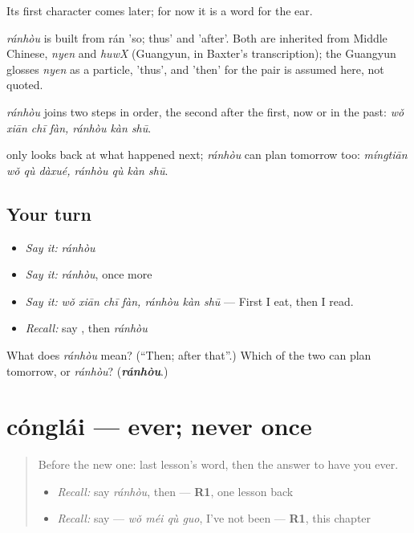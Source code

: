 Its first character comes later; for now it is a word for the ear.

\begin{cousinweb}
\emph{ránhòu} is built from rán 'so; thus' and  'after'. Both are inherited from Middle Chinese, \emph{nyen} and \emph{huwX} (Guangyun, in Baxter's transcription); the Guangyun glosses \emph{nyen} as a particle, 'thus', and 'then' for the pair is assumed here, not quoted.
\end{cousinweb}

\begin{grammarlens}[title={What you've built}]
\emph{ránhòu} joins two steps in order, the second after the first, now or in the past: \emph{wǒ xiān chī fàn, ránhòu kàn shū}.

 only looks back at what happened next; \emph{ránhòu} can plan tomorrow too: \emph{míngtiān wǒ qù dàxué, ránhòu qù kàn shū}.
\end{grammarlens}

\subsection*{Your turn}
\begin{itemize}
\raggedright
  \item \emph{Say it:} \emph{ránhòu}
  \item \emph{Say it:} \emph{ránhòu}, once more
  \item \emph{Say it:} \emph{wǒ xiān chī fàn, ránhòu kàn shū} — First I eat, then I read.
  \item \emph{Recall:} say , then \emph{ránhòu}
\end{itemize}

\begin{tcolorbox}[breakable,colback=teal!4,colframe=teal!35!black,title={Before you move on}]
What does \emph{ránhòu} mean? (\textquotedblleft{}Then; after that\textquotedblright{}.) Which of the two can plan tomorrow,  or \emph{ránhòu}? (\emph{\textbf{ránhòu}}.)
\end{tcolorbox}
\section[cónglái]{cónglái — ever; never once}

\label{lesson:ZH-C150-conglai}



\begin{quote}
Before the new one: last lesson's word, then the answer to have you ever.

\begin{itemize}
\raggedright
  \item \emph{Recall:} say \emph{ránhòu}, then — \textbf{R1}, one lesson back
  \item \emph{Recall:} say  — \emph{wǒ méi qù guo}, I've not been — \textbf{R1}, this chapter
\end{itemize}
\end{quote}

